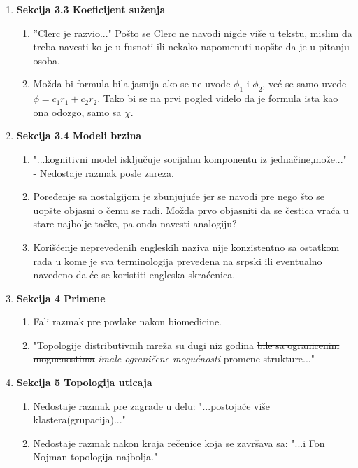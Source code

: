 \documentclass[a4paper]{report}
\begin{document}
\begin{enumerate}
    \item \textbf{Sekcija 3.3 Koeficijent suženja}
    \begin{enumerate}
        \item ''Clerc je razvio..." Pošto se Clerc ne navodi nigde više u tekstu, mislim da treba navesti ko je u fusnoti ili nekako napomenuti uopšte da je u pitanju osoba.
        \item Možda bi formula bila jasnija ako se ne uvode $\phi_1$ i $\phi_2$, već se samo uvede $\phi=c_1r_1+c_2r_2$. Tako bi se na prvi pogled videlo da je formula ista kao ona odozgo, samo sa $\chi$.
    \end{enumerate}
    
    \item \textbf{Sekcija 3.4 Modeli brzina}
    \begin{enumerate}
        \item "...kognitivni model isključuje socijalnu komponentu iz jednačine,može..." - Nedostaje razmak posle zareza.
        \item Poređenje sa nostalgijom je zbunjujuće jer se navodi pre nego što se uopšte objasni o čemu se radi. Možda prvo objasniti da se čestica vraća u stare najbolje tačke, pa onda navesti analogiju?
        \item Korišćenje neprevedenih engleskih naziva nije konzistentno sa ostatkom rada u kome je sva terminologija prevedena na srpski ili eventualno navedeno da će se koristiti engleska skraćenica.
    \end{enumerate}
    
    \item \textbf{Sekcija 4 Primene}
    \begin{enumerate}
        \item Fali razmak pre povlake nakon biomedicine.
        \item "Topologije distributivnih mreža su dugi niz godina \st{bile sa ogranicenim mogucnostima} \textit{imale ograničene mogućnosti} promene strukture..."
    \end{enumerate}
    
    \item \textbf{Sekcija 5 Topologija uticaja}
    \begin{enumerate}
        \item Nedostaje razmak pre zagrade u delu: "...postojaće više klastera(grupacija)..."
        \item Nedostaje razmak nakon kraja rečenice koja se završava sa: "...i Fon Nojman topologija najbolja."
    \end{enumerate}
    
\end{enumerate}
\end{document}
